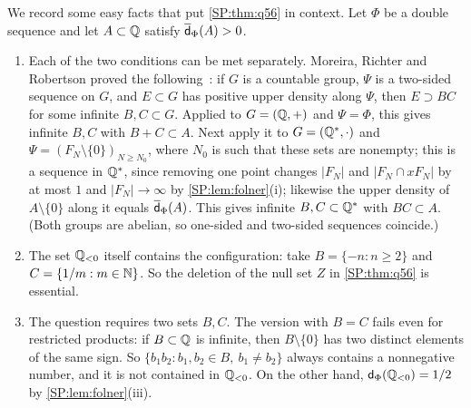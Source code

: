 \begin{remark}\label{SP:rem:q56easy}
We record some easy facts that put \cref{SP:thm:q56} in context. Let $\Phi$ be a double \Fol{}
sequence and let $A\subset\mathbb{Q}$ satisfy $\overline{\mathsf{d}}_\Phi(A)>0$.
\begin{enumerate}[label=\textup{(\roman*)}]
\item Each of the two conditions can be met separately. Moreira, Richter and Robertson proved the
following~\cite[Theorem~1.3]{moreira2019proof}: if $G$ is a countable group, $\Psi$ is a two-sided
\Fol{} sequence on $G$, and $E\subset G$ has positive upper density along $\Psi$, then $E\supset BC$
for some infinite $B,C\subset G$. Applied to $G=(\mathbb{Q},+)$ and $\Psi=\Phi$, this gives infinite $B,C$
with $B+C\subset A$. Next apply it to $G=(\mathbb{Q}^*,\cdot)$ and $\Psi=(F_N\setminus\{0\})_{N\ge N_0}$, where $N_0$ is such that these sets are nonempty; this is a
\Fol{} sequence in $\mathbb{Q}^*$, since removing one point changes $|F_N|$ and $|F_N\cap xF_N|$ by at most $1$
and $|F_N|\to\infty$ by \cref{SP:lem:folner}(i); likewise the upper density of $A\setminus\{0\}$
along it equals $\overline{\mathsf{d}}_\Phi(A)$. This gives infinite $B,C\subset\mathbb{Q}^*$ with $BC\subset A$. (Both
groups are abelian, so one-sided and two-sided \Fol{} sequences coincide.)
\item The set $\mathbb{Q}_{<0}$ itself contains the configuration: take $B=\{-n:n\ge2\}$ and
$C=\{1/m:m\in\mathbb{N}\}$. So the deletion of the null set $Z$ in \cref{SP:thm:q56} is essential.
\item The question requires two sets $B,C$. The version with $B=C$ fails even for restricted
products: if $B\subset\mathbb{Q}$ is infinite, then $B\setminus\{0\}$ has two distinct elements of the
same sign. So $\{b_1b_2:b_1,b_2\in B,\ b_1\neq b_2\}$ always contains a nonnegative number, and it
is not contained in $\mathbb{Q}_{<0}$. On the other hand, $\mathsf{d}_\Phi(\mathbb{Q}_{<0})=1/2$ by
\cref{SP:lem:folner}(iii).
\end{enumerate}
\end{remark}

